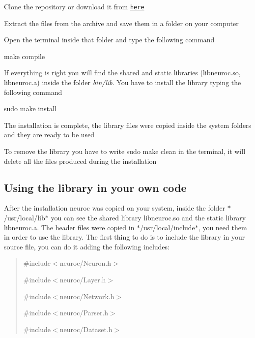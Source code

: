 \begin{DoxyEnumerate}
\item Clone the repository or download it from \href{https://github.com/mpatacchiola/neuroc/archive/master.zip}{\tt here}
\item Extract the files from the archive and save them in a folder on your computer
\item Open the terminal inside that folder and type the following command
\item {\ttfamily make compile}
\item If everything is right you will find the shared and static libraries (libneuroc.\-so, libneuroc.\-a) inside the folder {\itshape bin/lib}. You have to install the library typing the following command
\item {\ttfamily sudo make install}
\item The installation is complete, the library files were copied inside the system folders and they are ready to be used
\item To remove the library you have to write {\ttfamily sudo make clean} in the terminal, it will delete all the files produced during the installation
\end{DoxyEnumerate}

\subsection*{Using the library in your own code }

After the installation neuroc was copied on your system, inside the folder $\ast$/usr/local/lib$\ast$ you can see the shared library libneuroc.\-so and the static library libneuroc.\-a. The header files were copied in $\ast$/usr/local/include$\ast$, you need them in order to use the library. The first thing to do is to include the library in your source file, you can do it adding the following includes\-:

\begin{quotation}
{\ttfamily \#include$<$neuroc/\-Neuron.\-h$>$}

{\ttfamily \#include$<$neuroc/\-Layer.\-h$>$}

{\ttfamily \#include$<$neuroc/\-Network.\-h$>$}

{\ttfamily \#include$<$neuroc/\-Parser.\-h$>$}

{\ttfamily \#include$<$neuroc/\-Dataset.\-h$>$}

\end{quotation}


